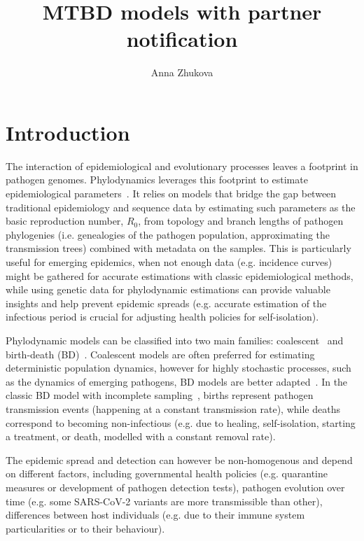 \documentclass[a4paper,10pt]{article}
\title{MTBD models with partner notification}
\author{Anna Zhukova}
\begin{document}
\maketitle

%

\section{Introduction}
The interaction of epidemiological and evolutionary processes leaves a footprint in pathogen genomes. Phylodynamics leverages this footprint to estimate epidemiological parameters~\citep{Grenfell2004a,Volz2013}. It relies on models that bridge the gap between traditional epidemiology and sequence data by estimating such parameters as the basic reproduction number, $R_0$, from topology and branch lengths of pathogen phylogenies (i.e. genealogies of the pathogen population, approximating the transmission trees) combined with metadata on the samples. This is particularly useful for emerging epidemics, when not enough data (e.g. incidence curves) might be gathered for accurate estimations with classic epidemiological methods, while using genetic data for phylodynamic estimations can provide valuable insights and help prevent epidemic spreads (e.g. accurate estimation of the infectious period is crucial for adjusting health policies for self-isolation).


Phylodynamic models can be classified into two main families:  coalescent~\citep{Volz2009a,Drummond2005,Pybus2000a} and birth-death (BD)~\citep{Kendall1948,Maddison2007,Stadler2009,Stadler2010}. Coalescent models are often preferred for estimating deterministic population dynamics, however for highly stochastic processes, such as the dynamics of emerging pathogens, BD models are better adapted~\citep{Macpherson2021}. In the classic BD model with incomplete sampling~\citep{Stadler2009}, births represent pathogen transmission events (happening at a constant transmission rate), while deaths correspond to becoming non-infectious (e.g. due to healing, self-isolation, starting a treatment, or death, modelled with a constant removal rate). 

The epidemic spread and detection can however be non-homogenous and depend on different factors, including governmental health policies (e.g. quarantine measures or development of pathogen detection tests), pathogen evolution over time (e.g. some SARS-CoV-2 variants are more transmissible than other),  differences between host individuals (e.g. due to their immune system particularities or to their behaviour).
\end{document}
